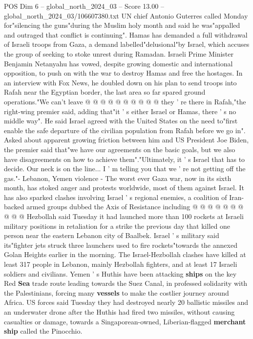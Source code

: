 \begin{textsample}{POS Dim 6 – global\_north\_2024\_03 – Score 13.00 – global\_north\_2024\_03/106607380.txt}
UN chief Antonio Guterres called Monday for"silencing the guns"during the Muslim holy month and said he was"appalled and outraged that conflict is continuing".
Hamas has demanded a full withdrawal of Israeli troops from Gaza, a demand labelled"delusional"by Israel, which accuses the group of seeking to stoke unrest during Ramadan.
Israeli Prime Minister Benjamin Netanyahu has vowed, despite growing domestic and international opposition, to push on with the war to destroy Hamas and free the hostages.
In an interview with Fox News, he doubled down on his plan to send troops into Rafah near the Egyptian border, the last area so far spared ground operations."We can't leave @ @ @ @ @ @ @ @ @ @ they ' re there in Rafah,"the right-wing premier said, adding that"it ' s either Israel or Hamas, there ' s no middle way".
He said Israel agreed with the United States on the need to"first enable the safe departure of the civilian population from Rafah before we go in".
Asked about apparent growing friction between him and US President Joe Biden, the premier said that"we have our agreements on the basic goals, but we also have disagreements on how to achieve them"."Ultimately, it ' s Israel that has to decide.
Our neck is on the line...
I ' m telling you that we ' re not getting off the gas."- Lebanon, Yemen violence - The worst ever Gaza war, now in its sixth month, has stoked anger and protests worldwide, most of them against Israel.
It has also sparked clashes involving Israel ' s regional enemies, a coalition of Iran-backed armed groups dubbed the Axis of Resistance including @ @ @ @ @ @ @ @ @ @ Hezbollah said Tuesday it had launched more than 100 rockets at Israeli military positions in retaliation for a strike the previous day that killed one person near the eastern Lebanon city of Baalbek.
Israel ' s military said its"fighter jets struck three launchers used to fire rockets"towards the annexed Golan Heights earlier in the morning.
The Israel-Hezbollah clashes have killed at least 317 people in Lebanon, mainly Hezbollah fighters, and at least 17 Israeli soldiers and civilians.
Yemen ' s Huthis have been attacking \textbf{ships} on the key Red \textbf{Sea} trade route leading towards the Suez Canal, in professed solidarity with the Palestinians, forcing many \textbf{vessels} to make the costlier journey around Africa.
US forces said Tuesday they had destroyed nearly 20 ballistic missiles and an underwater drone after the Huthis had fired two missiles, without causing casualties or damage, towards a Singaporean-owned, Liberian-flagged \textbf{merchant} \textbf{ship} called the Pinocchio.

\end{textsample}

